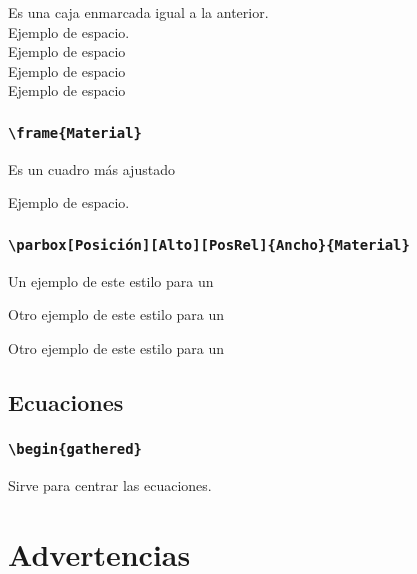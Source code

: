 Es una caja enmarcada igual a la anterior.\\


Ejemplo de  espacio.\\
Ejemplo de  espacio\\
Ejemplo de  espacio\\
Ejemplo de  espacio\\

\subsubsection{\texttt{\textbackslash frame\{Material\}}}

Es un cuadro más ajustado

Ejemplo de  espacio.\\


\subsubsection{\texttt{\textbackslash parbox[Posición][Alto][PosRel]\{Ancho\}\{Material\}}}

Un ejemplo de este estilo para un 


Otro ejemplo de este estilo para un 


Otro ejemplo de este estilo para un 



\subsection{Ecuaciones}

\subsubsection{\texttt{\textbackslash  begin\{gathered\}}}

Sirve para centrar las ecuaciones.



\section{Advertencias}

